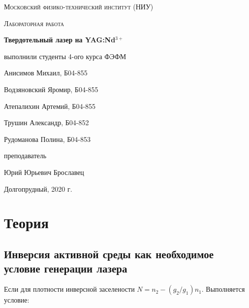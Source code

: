 \documentclass[a4paper]{article}
\begin{document}
\begin{titlepage}
\noindent

	\centering
	\vspace{2cm}
	{\scshape\LARGE Московский физико-технический институт (НИУ)\par}
	\vspace{1cm}
	{\scshape\Large Лабораторная работа\par}
	\vspace{1cm}
	{\huge\bfseries Твердотельный лазер на YAG:Nd$^{3+}$ \par}
	\vspace{1cm}

	\vfill
	
\begin{flushright}
	{\large выполнили студенты 4-ого курса ФЭФМ}\par
	\vspace{0.3cm}
	{\LARGE Анисимов Михаил, Б04-855} \par
	{\LARGE Водзяновский Яромир, Б04-855} \par
	{\LARGE Атепалихин Артемий, Б04-855} \par
	{\LARGE Трушин Александр, Б04-852} \par
	{\LARGE Рудоманова Полина, Б04-853} \par
	\vspace{0.3cm}
	{\large преподаватель}\par
	\vspace{0.3cm}
	{\LARGE Юрий Юрьевич Брославец} \par
\end{flushright}

\vfill

	Долгопрудный, 2020 г.
\end{titlepage}

\tableofcontents

\newpage

\section{Теория}
\subsection{Инверсия активной среды как необходимое условие генерации лазера}

Если для плотности инверсной заселености $N = n_2 - (g_2/g_1) n_1$. Выполняется условие:
\end{document}
